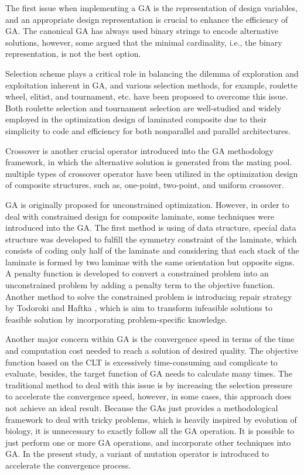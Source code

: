 The first issue when implementing a GA is the representation of design
variables, and an appropriate design representation is crucial to enhance the
efficiency of GA. The canonical GA has always used binary strings to encode
alternative solutions, however, some argued that the minimal cardinality, i.e.,
the binary representation, is not the best option. 

Selection scheme plays a critical role in balancing the dilemma of exploration
and exploitation inherent in GA, and various selection methods, for example,
roulette wheel, elitist, and tournament, etc. have been proposed to overcome
this issue. Both roulette selection and tournament selection are well-studied
and widely employed in the optimization design of laminated composite due to
their simplicity to code and efficiency for both nonparallel and parallel
architectures.

Crossover is another crucial operator introduced into the GA
methodology framework, in which the alternative solution is generated from the
mating pool.  multiple types of crossover operator have been utilized in the optimization
design of composite structures, such as, one-point, two-point, and uniform
crossover.

GA is originally proposed for unconstrained optimization. However, in order to
deal with constrained design for composite laminate, some techniques were
introduced into the GA. The first method is using of data structure, special
data structure was developed to fulfill the symmetry constraint of the laminate,
which consists of coding only half of the laminate and considering that each
stack of the laminate is formed by two laminae with the same orientation but
opposite signs\cite{le1995improved,kogiso1994design}. A penalty function is
developed to convert a constrained problem into an unconstrained problem by
adding a penalty term to the objective function. Another method to solve the
constrained problem is introducing repair strategy by Todoroki and Haftka
\cite{todoroki1998stacking}, which is aim to transform infeasible solutions to
feasible solution by incorporating problem-specific knowledge. 

Another major concern within GA is the convergence speed in terms of the time
and computation cost needed to reach a solution of desired quality. The
objective function based on the CLT is excessively time-consuming and complicate
to evaluate, besides, the target function of GA  needs to calculate many
times. The traditional method to deal with this issue is by increasing the
selection pressure to accelerate the convergence speed, however, in some cases,
this approach does not achieve an ideal result. Because the GAs just provides a
methodological framework to deal with tricky problems, which is heavily
inspired by evolution of biology, it is unnecessary to exactly follow all the
GA operation. It is possible to just perform one or more GA operations, and
incorporate other techniques into GA. In the present study, a variant of mutation
operator is introduced to accelerate the convergence process.
  

